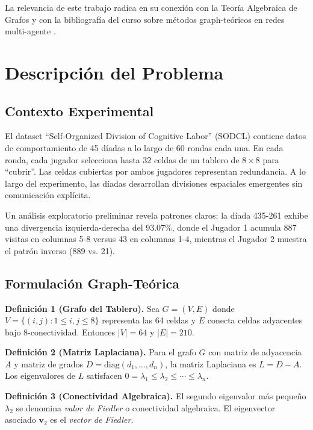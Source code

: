 \documentclass[conference]{IEEEtran}
\begin{document}
La relevancia de este trabajo radica en su conexión con la Teoría Algebraica de Grafos \cite{chung1997, fiedler1973} y con la bibliografía del curso sobre métodos graph-teóricos en redes multi-agente \cite{mesbahi2010}.

\section{Descripción del Problema}

\subsection{Contexto Experimental}

El dataset ``Self-Organized Division of Cognitive Labor'' (SODCL) \cite{andrade2021} contiene datos de comportamiento de 45 díadas a lo largo de 60 rondas cada una. En cada ronda, cada jugador selecciona hasta 32 celdas de un tablero de $8 \times 8$ para ``cubrir''. Las celdas cubiertas por ambos jugadores representan redundancia. A lo largo del experimento, las díadas desarrollan divisiones espaciales emergentes sin comunicación explícita.

Un análisis exploratorio preliminar revela patrones claros: la díada 435-261 exhibe una divergencia izquierda-derecha del 93.07\%, donde el Jugador 1 acumula 887 visitas en columnas 5-8 versus 43 en columnas 1-4, mientras el Jugador 2 muestra el patrón inverso (889 vs. 21).

\subsection{Formulación Graph-Teórica}

\textbf{Definición 1 (Grafo del Tablero).} Sea $G = (V, E)$ donde $V = \{(i,j) : 1 \leq i,j \leq 8\}$ representa las 64 celdas y $E$ conecta celdas adyacentes bajo 8-conectividad. Entonces $|V| = 64$ y $|E| = 210$.

\textbf{Definición 2 (Matriz Laplaciana).} Para el grafo $G$ con matriz de adyacencia $A$ y matriz de grados $D = \text{diag}(d_1, \ldots, d_n)$, la matriz Laplaciana es $L = D - A$. Los eigenvalores de $L$ satisfacen $0 = \lambda_1 \leq \lambda_2 \leq \cdots \leq \lambda_n$.

\textbf{Definición 3 (Conectividad Algebraica).} El segundo eigenvalor más pequeño $\lambda_2$ se denomina \textit{valor de Fiedler} o conectividad algebraica. El eigenvector asociado $\mathbf{v}_2$ es el \textit{vector de Fiedler}.
\end{document}
